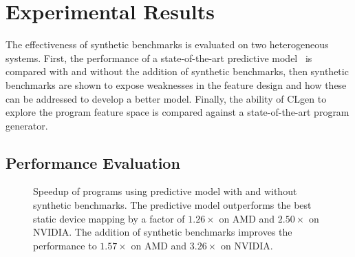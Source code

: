 \section{Experimental Results}
\label{sec:clgen-eval-results}

The effectiveness of synthetic benchmarks is evaluated on two heterogeneous systems. First, the performance of a state-of-the-art predictive model~\cite{Grewe2013} is compared with and without the addition of synthetic benchmarks, then synthetic benchmarks are shown to expose weaknesses in the feature design and how these can be addressed to develop a better model. Finally, the ability of CLgen to explore the program feature space is compared against a state-of-the-art program generator.

\subsection{Performance Evaluation}

\begin{figure}
  \centering %
  \caption[Speedup of predictions with and without synthetic benchmarks]{%
    Speedup of programs using \citeauthor{Grewe2013} predictive model with and without synthetic benchmarks. The predictive model outperforms the best static device mapping by a factor of $1.26\times$ on AMD and $2.50\times$ on NVIDIA. The addition of synthetic benchmarks improves the performance to $1.57\times$ on AMD and $3.26\times$ on NVIDIA.%
  }%
  \label{fig:npb} %
\end{figure}

